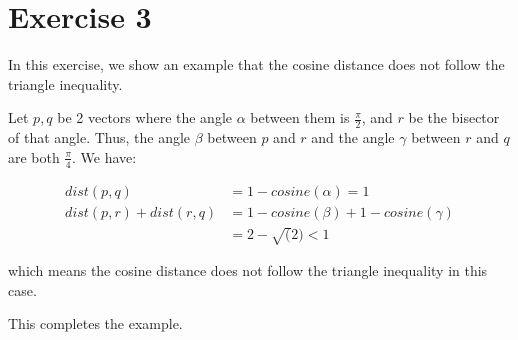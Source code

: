 \section*{Exercise 3}
In this exercise, we show an example that the cosine distance does not follow the triangle inequality.

Let $p,q$ be 2 vectors where the angle $\alpha$ between them is $\frac{\pi}{2}$, and $r$ be the bisector of that angle. Thus, the angle $\beta$ between $p$ and $r$ and
the angle $\gamma$ between $r$ and $q$ are both $\frac{\pi}{4}$. We have:

\begin{align*}
  dist(p,q) &= 1 - cosine(\alpha) = 1 \\
  dist(p,r) + dist(r,q) &= 1 - cosine(\beta) + 1 - cosine(\gamma) \\
  &= 2 - \sqrt(2) < 1
\end{align*}

which means the cosine distance does not follow the triangle inequality in this case.

This completes the example.
